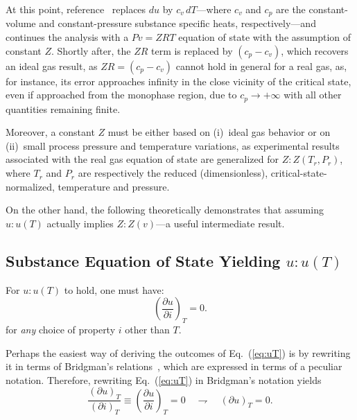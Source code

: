 \documentclass[fleqn,11pt]{SelfArx}
\newcommand{\parxyz}[3]{\left(\frac{\partial {{#1}}}{\partial {{#2}}}\right)_{\!\!\!{#3}}}
\newcommand{\bri}[2]{(\partial {{#1}})_{{#2}}}
\begin{document}
    At  this   point,   reference~\cite{2012-ChristiansJ-IntJMechEngEduc}   replaces   $du$   by
    $c_v\,dT$---where $c_v$ and $c_p$ are the constant-volume  and  constant-pressure  substance
    specific heats, respectively---and continues the analysis with a  $Pv  =  ZRT$  equation  of
    state with the assumption of constant $Z$. Shortly after, the $ZR$ term is replaced by $(c_p
    - c_v)$, which recovers an ideal gas result, as $ZR = (c_p - c_v)$ cannot  hold  in  general
    for a real gas, as, for instance, its error approaches infinity in the close vicinity of the
    critical state, even if approached from the monophase region, due to $c_p \to +\infty$  with
    all other quantities remaining finite.

    Moreover, a constant $Z$ must be either based on (i)~ideal gas  behavior  or  on  (ii)~small
    process pressure and temperature variations, as experimental  results  associated  with  the
    real gas equation of state are generalized for $Z\!:\!Z(T_r, P_r)$, where  $T_r$  and  $P_r$
    are respectively the reduced  (dimensionless),  critical-state-normalized,  temperature  and
    pressure.

    On the other hand, the  following  theoretically  demonstrates  that  assuming  $u\!:\!u(T)$
    actually implies $Z\!:\!Z(v)$---a useful intermediate result.

    \subsection{Substance Equation of State Yielding $u\!:\!u(T)$}

    For $u\!:\!u(T)$ to hold, one must have:
    \begin{equation}
        \parxyz uiT = 0.
        \label{eq:uT}
    \end{equation}
    \noindent for \emph{any} choice of property $i$ other than $T$.

    Perhaps the easiest way of deriving the outcomes of Eq.~(\ref{eq:uT}) is by rewriting it  in
    terms of Bridgman's relations~\cite{2006-BejanA-Wiley}, which are expressed in  terms  of  a
    peculiar notation. Therefore, rewriting Eq.~(\ref{eq:uT}) in Bridgman's notation yields
    \begin{equation}
        \frac{\bri uT}{\bri iT} \equiv \parxyz uiT = 0 \quad\rightharpoondown\quad \bri uT = 0.
        \label{eq:uT.bri}
    \end{equation}
\end{document}
